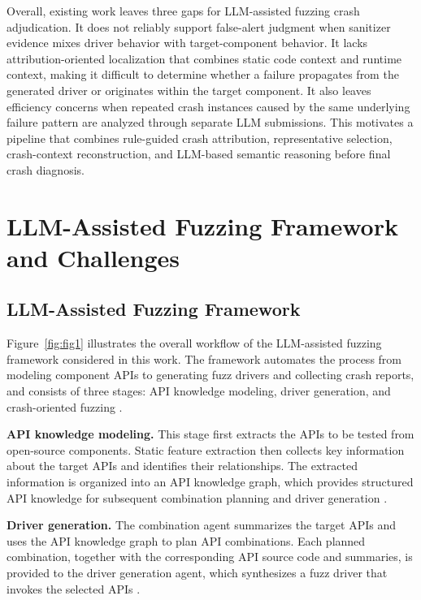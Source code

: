 \documentclass[pdflatex,sn-basic]{sn-jnl}%
\theoremstyle{thmstyleone}%
\theoremstyle{thmstyletwo}%
\theoremstyle{thmstylethree}%
\begin{document}
Overall, existing work leaves three gaps for LLM-assisted fuzzing crash adjudication. It does not reliably support false-alert judgment when sanitizer evidence mixes driver behavior with target-component behavior. It lacks attribution-oriented localization that combines static code context and runtime context, making it difficult to determine whether a failure propagates from the generated driver or originates within the target component. It also leaves efficiency concerns when repeated crash instances caused by the same underlying failure pattern are analyzed through separate LLM submissions. This motivates a pipeline that combines rule-guided crash attribution, representative selection, crash-context reconstruction, and LLM-based semantic reasoning before final crash diagnosis.



\section{LLM-Assisted Fuzzing Framework and Challenges}
\label{sec:preliminaries}

\subsection{LLM-Assisted Fuzzing Framework}

Figure~\ref{fig:fig1} illustrates the overall workflow of the LLM-assisted fuzzing framework considered in this work. The framework automates the process from modeling component APIs to generating fuzz drivers and collecting crash reports, and consists of three stages: API knowledge modeling, driver generation, and crash-oriented fuzzing \citep{ref12}.

\textbf{API knowledge modeling.} This stage first extracts the APIs to be tested from open-source components. Static feature extraction then collects key information about the target APIs and identifies their relationships. The extracted information is organized into an API knowledge graph, which provides structured API knowledge for subsequent combination planning and driver generation \citep{ref12}.

\textbf{Driver generation.} The combination agent summarizes the target APIs and uses the API knowledge graph to plan API combinations. Each planned combination, together with the corresponding API source code and summaries, is provided to the driver generation agent, which synthesizes a fuzz driver that invokes the selected APIs \citep{ref8,ref12,ref13}.
\end{document}
